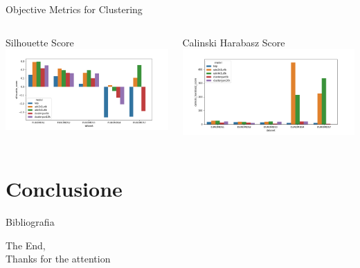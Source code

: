\documentclass{beamer}
\begin{document}
\begin{frame}{Objective Metrics for Clustering}
\begin{minipage}[0.95\textheight]{\textwidth}
\begin{columns}[T]
	\begin{column}{0.33\textwidth}
	Silhouette Score
	\centering
	\includegraphics[width=\textwidth, keepaspectratio]{./images/silh_score.png}
	\end{column}
	\begin{column}{0.33\textwidth}
	Calinski Harabasz Score
	\centering
	\includegraphics[width=\textwidth, keepaspectratio]{./images/cal_har_score.png}
	\end{column}
\end{columns}
\end{minipage}
\end{frame}

\begin{frame}{}
\end{frame}


\section{Conclusione}

\begin{frame}{Bibliografia}
	\fontsize{8pt}{7.2}\selectfont
	
	
\end{frame}

\begin{frame}{}
	The End,\\
	Thanks for the attention
\end{frame}
\end{document}
